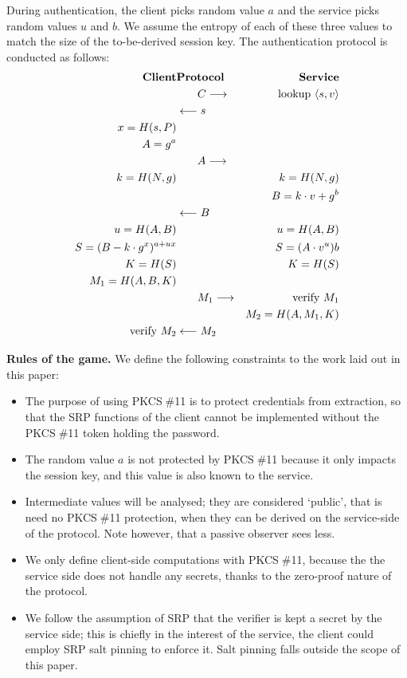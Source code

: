 \documentclass[a4paper,11pt]{article}
\def\pkcs11{PKCS$\;$\#11\xspace}
\def\tol#1{\longleftarrow\strut{}#1\strut\phantom{\longrightarrow}}
\def\tor#1{\phantom{\longleftarrow\strut}#1\strut\longrightarrow}
\begin{document}
During authentication, the client picks random value $a$ and the service picks random values $u$ and $b$.  We assume the entropy of each of these three values to match the size of the to-be-derived session key.  The authentication protocol is conducted as follows:
%
\begin{eqnarray*}
\textbf{Client}&\textbf{Protocol}&\textbf{Service}\\
&\tor{C}&\textrm{lookup $\langle s,v\rangle$}\\
&\tol{s}&\\
x=H(s,P)&&\\
A=g^a&&\\
& \tor{A}&\\
k=H(N,g)&&k=H(N,g)\\
&&B=k\cdot v+g^b\\
&\tol{B}&\\
u=H(A,B)&&u=H(A,B)\\
S=(B-k\cdot g^x)^{a+ux} && S=(A\cdot v^u)b\\
K=H(S)&&K=H(S)\\
M_1=H(A,B,K)&&\\
&\tor{M_1}&\textrm{verify $M_1$}\\
&&M_2=H(A,M_1,K)\\
\textrm{verify $M_2$}&\tol{M_2}&
\end{eqnarray*}



\textbf{Rules of the game.}  We define the following constraints to the work laid out in this paper:
\begin{itemize}
\item The purpose of using \pkcs11 is to protect credentials from extraction, so that the SRP functions of the client cannot be implemented without the \pkcs11 token holding the password.
\item The random value $a$ is not protected by \pkcs11 because it only impacts the session key, and this value is also known to the service.
\item Intermediate values will be analysed; they are considered `public', that is need no \pkcs11 protection, when they can be derived on the service-side of the protocol.  Note however, that a passive observer sees less.
\item We only define client-side computations with \pkcs11, because the the service side does not handle any secrets, thanks to the zero-proof nature of the protocol.
\item We follow the assumption of SRP that the verifier is kept a secret by the service side; this is chiefly in the interest of the service, the client could employ SRP salt pinning to enforce it.  Salt pinning falls outside the scope of this paper.
\end{itemize}
\end{document}
